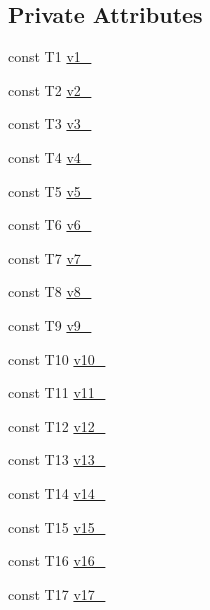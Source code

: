 \subsection*{Private Attributes}
\begin{DoxyCompactItemize}
\item 
const T1 \mbox{\hyperlink{classtesting_1_1internal_1_1_value_array17_a4b6d81d35ec00543f64aa5af5ba8b567}{v1\+\_\+}}
\item 
const T2 \mbox{\hyperlink{classtesting_1_1internal_1_1_value_array17_a7909d3b06ed1741941052d054aae5354}{v2\+\_\+}}
\item 
const T3 \mbox{\hyperlink{classtesting_1_1internal_1_1_value_array17_a5c57a4c0b696192fc3fbdff288d81ffa}{v3\+\_\+}}
\item 
const T4 \mbox{\hyperlink{classtesting_1_1internal_1_1_value_array17_a1171197fc0cc8b965db8c3638be27168}{v4\+\_\+}}
\item 
const T5 \mbox{\hyperlink{classtesting_1_1internal_1_1_value_array17_ac00e101d57e0a9f3978af4807471f389}{v5\+\_\+}}
\item 
const T6 \mbox{\hyperlink{classtesting_1_1internal_1_1_value_array17_a0cf2f72b278558dc6b3586664179c301}{v6\+\_\+}}
\item 
const T7 \mbox{\hyperlink{classtesting_1_1internal_1_1_value_array17_aaa2214a028cee5771f39c25c9d198b6f}{v7\+\_\+}}
\item 
const T8 \mbox{\hyperlink{classtesting_1_1internal_1_1_value_array17_a796765f900682af79351d7723c12cbdb}{v8\+\_\+}}
\item 
const T9 \mbox{\hyperlink{classtesting_1_1internal_1_1_value_array17_a2776b6c20d7c1b397bdd14243aa44382}{v9\+\_\+}}
\item 
const T10 \mbox{\hyperlink{classtesting_1_1internal_1_1_value_array17_aca0af5c95f79288491ee2058272d7eb1}{v10\+\_\+}}
\item 
const T11 \mbox{\hyperlink{classtesting_1_1internal_1_1_value_array17_aa8aae13f41bca8ce338f3255e0f68635}{v11\+\_\+}}
\item 
const T12 \mbox{\hyperlink{classtesting_1_1internal_1_1_value_array17_a2a858fe8d4d446f2462b5e9673cd9d3b}{v12\+\_\+}}
\item 
const T13 \mbox{\hyperlink{classtesting_1_1internal_1_1_value_array17_a16a1176fcb344e284c4895aa477c8052}{v13\+\_\+}}
\item 
const T14 \mbox{\hyperlink{classtesting_1_1internal_1_1_value_array17_a3206b08d2080090d68a890b41f563c52}{v14\+\_\+}}
\item 
const T15 \mbox{\hyperlink{classtesting_1_1internal_1_1_value_array17_a688db9667ebcc675829c9b09e9b7e01f}{v15\+\_\+}}
\item 
const T16 \mbox{\hyperlink{classtesting_1_1internal_1_1_value_array17_afb0764d4f34ff084a14c972b026f92cd}{v16\+\_\+}}
\item 
const T17 \mbox{\hyperlink{classtesting_1_1internal_1_1_value_array17_afc71dd4887adb47eb9a6b9daa52fa725}{v17\+\_\+}}
\end{DoxyCompactItemize}


